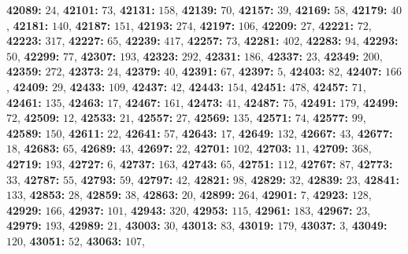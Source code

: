 \textsf{\bfseries 42089:} $24$, \textsf{\bfseries 42101:} $73$, \textsf{\bfseries 42131:} $158$, \textsf{\bfseries 42139:} $70$, \textsf{\bfseries 42157:} $39$, \textsf{\bfseries 42169:} $58$, \textsf{\bfseries 42179:} $40$, \textsf{\bfseries 42181:} $140$, \textsf{\bfseries 42187:} $151$, \textsf{\bfseries 42193:} $274$, \textsf{\bfseries 42197:} $106$, \textsf{\bfseries 42209:} $27$, \textsf{\bfseries 42221:} $72$, \textsf{\bfseries 42223:} $317$, \textsf{\bfseries 42227:} $65$, \textsf{\bfseries 42239:} $417$, \textsf{\bfseries 42257:} $73$, \textsf{\bfseries 42281:} $402$, \textsf{\bfseries 42283:} $94$, \textsf{\bfseries 42293:} $50$, \textsf{\bfseries 42299:} $77$, \textsf{\bfseries 42307:} $193$, \textsf{\bfseries 42323:} $292$, \textsf{\bfseries 42331:} $186$, \textsf{\bfseries 42337:} $23$, \textsf{\bfseries 42349:} $200$, \textsf{\bfseries 42359:} $272$, \textsf{\bfseries 42373:} $24$, \textsf{\bfseries 42379:} $40$, \textsf{\bfseries 42391:} $67$, \textsf{\bfseries 42397:} $5$, \textsf{\bfseries 42403:} $82$, \textsf{\bfseries 42407:} $166$, \textsf{\bfseries 42409:} $29$, \textsf{\bfseries 42433:} $109$, \textsf{\bfseries 42437:} $42$, \textsf{\bfseries 42443:} $154$, \textsf{\bfseries 42451:} $478$, \textsf{\bfseries 42457:} $71$, \textsf{\bfseries 42461:} $135$, \textsf{\bfseries 42463:} $17$, \textsf{\bfseries 42467:} $161$, \textsf{\bfseries 42473:} $41$, \textsf{\bfseries 42487:} $75$, \textsf{\bfseries 42491:} $179$, \textsf{\bfseries 42499:} $72$, \textsf{\bfseries 42509:} $12$, \textsf{\bfseries 42533:} $21$, \textsf{\bfseries 42557:} $27$, \textsf{\bfseries 42569:} $135$, \textsf{\bfseries 42571:} $74$, \textsf{\bfseries 42577:} $99$, \textsf{\bfseries 42589:} $150$, \textsf{\bfseries 42611:} $22$, \textsf{\bfseries 42641:} $57$, \textsf{\bfseries 42643:} $17$, \textsf{\bfseries 42649:} $132$, \textsf{\bfseries 42667:} $43$, \textsf{\bfseries 42677:} $18$, \textsf{\bfseries 42683:} $65$, \textsf{\bfseries 42689:} $43$, \textsf{\bfseries 42697:} $22$, \textsf{\bfseries 42701:} $102$, \textsf{\bfseries 42703:} $11$, \textsf{\bfseries 42709:} $368$, \textsf{\bfseries 42719:} $193$, \textsf{\bfseries 42727:} $6$, \textsf{\bfseries 42737:} $163$, \textsf{\bfseries 42743:} $65$, \textsf{\bfseries 42751:} $112$, \textsf{\bfseries 42767:} $87$, \textsf{\bfseries 42773:} $33$, \textsf{\bfseries 42787:} $55$, \textsf{\bfseries 42793:} $59$, \textsf{\bfseries 42797:} $42$, \textsf{\bfseries 42821:} $98$, \textsf{\bfseries 42829:} $32$, \textsf{\bfseries 42839:} $23$, \textsf{\bfseries 42841:} $133$, \textsf{\bfseries 42853:} $28$, \textsf{\bfseries 42859:} $38$, \textsf{\bfseries 42863:} $20$, \textsf{\bfseries 42899:} $264$, \textsf{\bfseries 42901:} $7$, \textsf{\bfseries 42923:} $128$, \textsf{\bfseries 42929:} $166$, \textsf{\bfseries 42937:} $101$, \textsf{\bfseries 42943:} $320$, \textsf{\bfseries 42953:} $115$, \textsf{\bfseries 42961:} $183$, \textsf{\bfseries 42967:} $23$, \textsf{\bfseries 42979:} $193$, \textsf{\bfseries 42989:} $21$, \textsf{\bfseries 43003:} $30$, \textsf{\bfseries 43013:} $83$, \textsf{\bfseries 43019:} $179$, \textsf{\bfseries 43037:} $3$, \textsf{\bfseries 43049:} $120$, \textsf{\bfseries 43051:} $52$, \textsf{\bfseries 43063:} $107$, 
